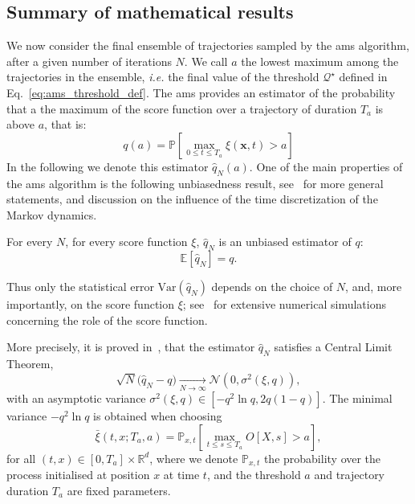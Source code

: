 \subsection{Summary of mathematical results}
We now consider the final ensemble of trajectories sampled by the \ac{ams} algorithm, after a given number
of iterations $N$.
We call $a$ the lowest maximum among the trajectories in the ensemble, \textit{i.e.} the final value of the threshold $\mathcal{Q}^{\star}$ defined in Eq.~\eqref{eq:ams_threshold_def}.
The \ac{ams} provides an estimator of the probability that a the maximum of the score function over a trajectory of duration $T_a$ is above $a$, that is:
\begin{equation}
  \label{eq:estimator_ams}
  q(a) = \mathbb{P}\left[ \underset{0\leq t \leq T_a}{\max} \xi(\mathbf{x}, t) > a \right]
\end{equation}
In the following we denote this estimator $\hat{q}_N(a)$.
One of the main properties of the \ac{ams} algorithm is the following unbiasedness result, see~\cite{brehier:hal-01142704} for more general statements, and discussion on the influence of the time discretization of the Markov dynamics.
\begin{theo}
  For every $N$, for every score function $\xi$, $\hat{q}_N$ is an unbiased estimator of $q$:
  \begin{equation}
    \mathbb{E}[\hat{q}_N]=q.
  \end{equation}
\end{theo}
Thus only the statistical error $\text{Var}(\hat{q}_N)$ depends on the choice of $N$, and, more importantly, on the score function $\xi$; see~\cite{brehier:hal-01142704,rolland_statistical_2015} for extensive numerical simulations concerning the role of the score function.

More precisely, it is proved in~\cite{Cerou2016}, that the estimator $\hat{q}_N$ satisfies a Central Limit Theorem,
\begin{equation}
  \sqrt{N}\bigl(\hat{q}_N-q\bigr)\underset{N\to \infty}\to\mathcal{N}(0,\sigma^2(\xi,q)),
\end{equation}
with an asymptotic variance $\sigma^2(\xi,q)\in [-q^2\ln q,2q(1-q)]$.
The minimal variance $-q^2\ln q$ is obtained when choosing
\begin{equation}
  \bar{\xi}(t,x;T_a,a)=\mathbb{P}_{x,t}\left\lbrack\underset{t\le s\le T_a}\max O[X,s] > a\right\rbrack,
  \label{eq:time_dependent_committor}
\end{equation}
for all $(t,x)\in[0,T_a]\times \mathbb{R}^d$, where we denote $\mathbb{P}_{x,t}$ the probability over the process initialised at position $x$ at time $t$, and the threshold $a$ and trajectory duration $T_a$ are fixed parameters.



